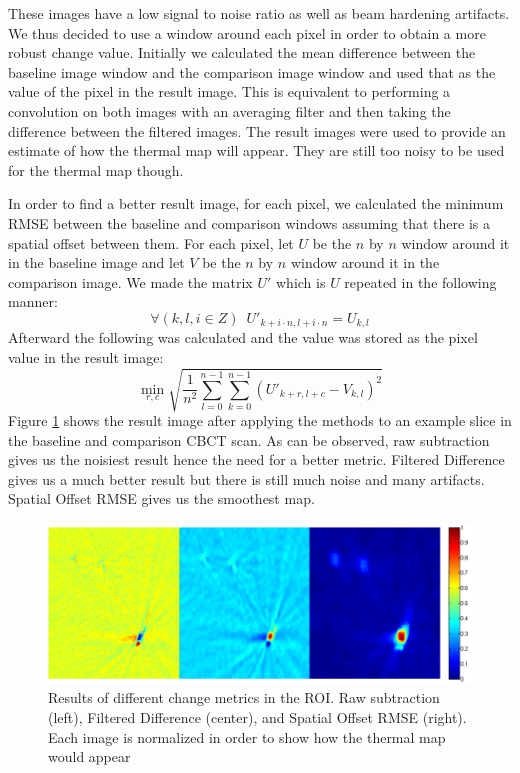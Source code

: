 \documentclass[]{spie}  %
\begin{document}
These images have a low signal to noise ratio as well as beam hardening artifacts. We thus decided to use a window around each pixel in order to obtain a more robust change value. Initially we calculated the mean difference between the baseline image window and the comparison image window and used that as the value of the pixel in the result image. This is equivalent to performing a convolution on both images with an averaging filter and then taking the difference between the filtered images. The result images were used to provide an estimate of how the thermal map will appear. They are still too noisy to be used for the thermal map though. 

In order to find a better result image, for each pixel, we calculated the minimum RMSE between the baseline and comparison windows assuming that there is a spatial offset between them. For each pixel, let $U$ be the $n$ by $n$ window around it in the baseline image and let $V$ be the $n$ by $n$ window around it in the comparison image. We made the matrix $U'$ which is $U$ repeated in the following manner:
\[
\forall(k,l,i \in Z)\, \, \, U'_{k+i \cdot n,l+i \cdot n} = U_{k,l}
\]
Afterward the following was calculated and the value was stored as the pixel value in the result image:
\[
\min_{r,c} \sqrt{ \frac{1}{n^2} \sum_{l=0}^{n-1} \sum_{k=0}^{n-1} {(U'_{k+r,l+c}-V_{k,l})^2}}
\]
Figure \ref{changeDetectionMethods} shows the result image after applying the methods to an example slice in the baseline and comparison CBCT scan. As can be observed, raw subtraction gives us the noisiest result hence the need for a better metric. Filtered Difference gives us a much better result but there is still much noise and many artifacts. Spatial Offset RMSE gives us the smoothest map. 

\begin{figure} 
\centering 
\includegraphics[width=\textwidth]{changeDetectionPanel2.png} 
\caption{Results of different change metrics in the ROI. Raw subtraction (left), Filtered Difference (center), and Spatial Offset RMSE (right). Each image is normalized in order to show how the thermal map would appear} 
\label{changeDetectionMethods}
\end{figure}
\end{document}
